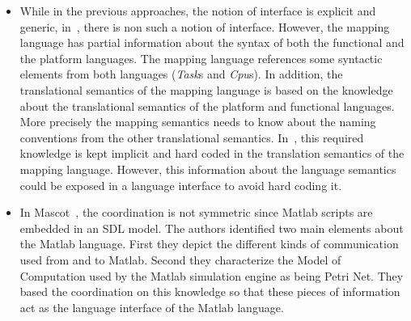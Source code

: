 \begin{itemize}
		\item While in the previous approaches, the notion of interface is explicit and generic, in~\cite{dinatale}, there is non such a notion of interface. However, the mapping language has partial information about the syntax of both the functional and the platform languages. The mapping language references some syntactic elements from both languages (\eg \emph{Task}s and \emph{Cpu}s). In addition, the translational semantics of the mapping language is based on the knowledge about the translational semantics of the platform and functional languages. More precisely the mapping semantics needs to know about the naming conventions from the other translational semantics. In~\cite{dinatale}, this required knowledge is kept implicit and hard coded in the translation semantics of the mapping language. However, this information about the language semantics could be exposed in a language interface to avoid hard coding it. 
			
		\item In Mascot~\cite{mascotbib}, the coordination is not symmetric since Matlab scripts are embedded in an SDL model.  The authors identified two main elements about the Matlab language. First they depict the different kinds of communication used from and to Matlab. Second they characterize the Model of Computation used by the Matlab simulation engine as being Petri Net. They based the coordination on this knowledge so that these pieces of information act as the language interface of the Matlab language. 
		\end{itemize}
